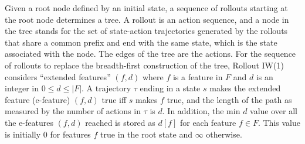 \documentclass[letterpaper]{article}
\newcommand{\pair}[1]{{(#1)}}
\begin{document}
Given a root node defined by an  initial state, a sequence of rollouts starting at the root node
determines a tree. A rollout is an action sequence, and a node in the tree stands
for the  set of state-action trajectories generated by the rollouts that
share  a common prefix and end with the same  state, which is the state
associated with the node. The edges of the tree are the actions. 
For the sequence of rollouts to  replace the breadth-first construction of the tree,
Rollout IW(1) considers ``extended features''  $\pair{f,d}$ where $f$ is a feature in $F$ and $d$ is an integer in
$0 \leq d \leq |F|$. A trajectory  $\tau$ ending in a state $s$ makes the extended feature (e-feature) $\pair{f,d}$ true
iff $s$ makes $f$ true, and the length of the path as measured by the number of actions in $\tau$ is $d$.
In addition, the min $d$ value over all the e-features $\pair{f,d}$ reached is stored as $d[f]$
for each feature $f \in F$. This  value  is initially $0$ for features $f$ true in the root state
and $\infty$ otherwise. 
\end{document}
